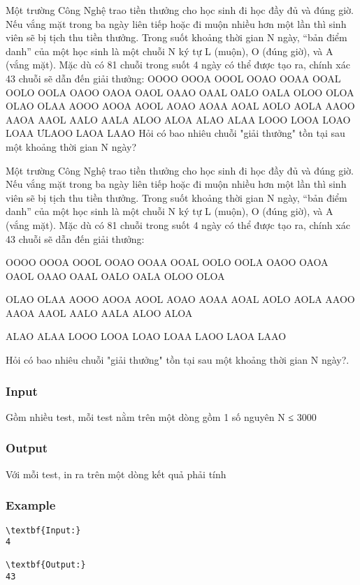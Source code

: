 



     Một trường Công Nghệ trao tiền thưởng cho học sinh đi học đầy đủ và đúng giờ. Nếu vắng mặt       trong ba ngày liên tiếp hoặc đi muộn nhiều hơn một lần thì sinh viên sẽ bị tịch thu tiền thưởng.       Trong suốt khoảng thời gian N ngày, “bản điểm danh” của một học sinh là một chuỗi N ký tự L       (muộn), O (đúng giờ), và A (vắng mặt).       Mặc dù có 81 chuỗi trong suốt 4 ngày có thể được tạo ra, chính xác 43 chuỗi sẽ dẫn đến giải       thưởng:       OOOO OOOA OOOL OOAO OOAA OOAL OOLO OOLA OAOO OAOA OAOL OAAO OAAL OALO OALA OLOO OLOA       OLAO OLAA AOOO AOOA AOOL AOAO AOAA AOAL AOLO AOLA AAOO AAOA AAOL AALO AALA ALOO ALOA ALAO       ALAA LOOO LOOA LOAO LOAA ƯLAOO LAOA LAAO       Hỏi có bao nhiêu chuỗi "giải thưởng" tồn tại sau một khoảng thời gian N ngày?    

   Một trường Công Nghệ trao tiền thưởng cho học sinh đi học đầy đủ và đúng giờ. Nếu vắng mặt trong ba ngày liên tiếp hoặc đi muộn nhiều hơn một lần thì sinh viên sẽ bị tịch thu tiền thưởng. Trong suốt khoảng thời gian N ngày, “bản điểm danh” của một học sinh là một chuỗi N ký tự L (muộn), O (đúng giờ), và A (vắng mặt). Mặc dù có 81 chuỗi trong suốt 4 ngày có thể được tạo ra, chính xác 43 chuỗi sẽ dẫn đến giải thưởng:  

   OOOO OOOA OOOL OOAO OOAA OOAL OOLO OOLA OAOO OAOA OAOL OAAO OAAL OALO OALA OLOO OLOA  

   OLAO OLAA AOOO AOOA AOOL AOAO AOAA AOAL AOLO AOLA AAOO AAOA AAOL AALO AALA ALOO ALOA  

   ALAO ALAA LOOO LOOA LOAO LOAA LAOO LAOA LAAO  

   Hỏi có bao nhiêu chuỗi "giải thưởng" tồn tại sau một khoảng thời gian N ngày?.  



\subsubsection{   Input  }

   Gồm nhiều test, mỗi test nằm trên một dòng gồm 1 số nguyên N ≤ 3000  

\subsubsection{   Output  }

   Với mỗi test, in ra trên một dòng kết quả phải tính  

\subsubsection{   Example  }
\begin{verbatim}
\textbf{Input:}
4

\textbf{Output:}
43
\end{verbatim}